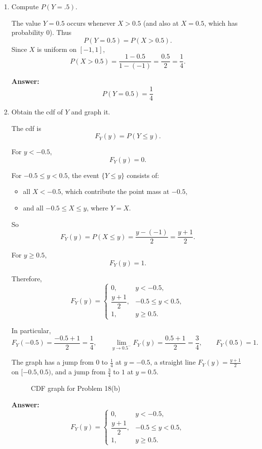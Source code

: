 \documentclass[11pt]{article}
\begin{document}
\begin{enumerate}
    \item[(a)] Compute \(P(Y=.5)\).

    The value \(Y=0.5\) occurs whenever \(X>0.5\) (and also at \(X=0.5\), which has probability \(0\)). Thus
    \[
    P(Y=0.5)=P(X>0.5).
    \]
    Since \(X\) is uniform on \([-1,1]\),
    \[
    P(X>0.5)=\frac{1-0.5}{1-(-1)}=\frac{0.5}{2}=\frac14.
    \]

    \textbf{Answer:}
    \[
    \boxed{P(Y=0.5)=\frac14}
    \]

    \item[(b)] Obtain the cdf of \(Y\) and graph it.

    The cdf is
    \[
    F_Y(y)=P(Y\le y).
    \]

    For \(y<-0.5\),
    \[
    F_Y(y)=0.
    \]

    For \(-0.5\le y<0.5\), the event \(\{Y\le y\}\) consists of:
    \begin{itemize}
        \item all \(X<-0.5\), which contribute the point mass at \(-0.5\),
        \item and all \(-0.5\le X\le y\), where \(Y=X\).
    \end{itemize}
    So
    \[
    F_Y(y)=P(X\le y)=\frac{y-(-1)}{2}=\frac{y+1}{2}.
    \]

    For \(y\ge 0.5\),
    \[
    F_Y(y)=1.
    \]

    Therefore,
    \[
    F_Y(y)=
    \begin{cases}
    0, & y<-0.5,\\[6pt]
    \dfrac{y+1}{2}, & -0.5\le y<0.5,\\[8pt]
    1, & y\ge 0.5.
    \end{cases}
    \]

    In particular,
    \[
    F_Y(-0.5)=\frac{-0.5+1}{2}=\frac14,
    \qquad
    \lim_{y\to 0.5^-}F_Y(y)=\frac{0.5+1}{2}=\frac34,
    \qquad
    F_Y(0.5)=1.
    \]

    The graph has a jump from \(0\) to \(\frac14\) at \(y=-0.5\), a straight line \(F_Y(y)=\frac{y+1}{2}\) on \([-0.5,0.5)\), and a jump from \(\frac34\) to \(1\) at \(y=0.5\).

    \begin{figure}[ht]
    \centering
    \vspace{2in}
    \caption{CDF graph for Problem 18(b)}
    \end{figure}

    \textbf{Answer:}
    \[
    \boxed{
    F_Y(y)=
    \begin{cases}
    0, & y<-0.5,\\[4pt]
    \dfrac{y+1}{2}, & -0.5\le y<0.5,\\[6pt]
    1, & y\ge 0.5.
    \end{cases}}
    \]
\end{enumerate}
\end{document}
